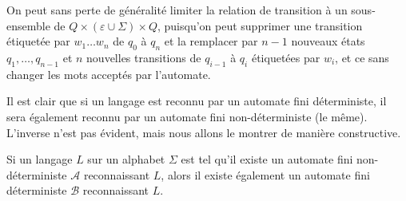 \begin{rem}
On peut sans perte de généralité limiter la relation de transition à un sous-ensemble de $Q\times(\varepsilon\cup\Sigma)\times Q$, puisqu'on peut supprimer une transition étiquetée par $w_1\dots w_n$ de $q_0$ à $q_n$ et la remplacer par $n-1$ nouveaux états $q_1, \dots, q_{n-1}$ et $n$ nouvelles transitions de $q_{i-1}$ à $q_i$ étiquetées par $w_i$, et ce sans changer les mots acceptés par l'automate.
\end{rem}

Il est clair que si un langage est reconnu par un automate fini déterministe, il sera également reconnu par un automate fini non-déterministe (le même). L'inverse n'est pas évident, mais nous allons le montrer de manière constructive.

\begin{pro}
Si un langage $L$ sur un alphabet $\Sigma$ est tel qu'il existe un automate fini non-déterministe $\mathcal A$ reconnaissant $L$, alors il existe également un automate fini déterministe $\mathcal{B}$ reconnaissant $L$.
\end{pro}

